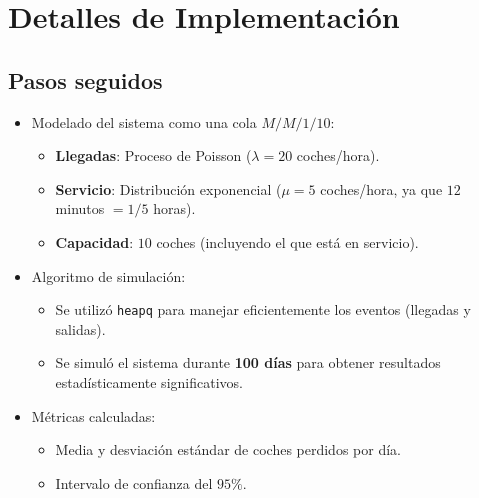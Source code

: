 \documentclass{article}
\begin{document}
\section{Detalles de Implementación}

\subsection{Pasos seguidos}
\begin{itemize}
    \item Modelado del sistema como una cola \( M/M/1/10 \):
    \begin{itemize}
        \item \textbf{Llegadas}: Proceso de Poisson (\(\lambda = 20\) coches/hora).
        \item \textbf{Servicio}: Distribución exponencial (\(\mu = 5\) coches/hora, ya que \(12\) minutos \(= 1/5\) horas).
        \item \textbf{Capacidad}: \(10\) coches (incluyendo el que está en servicio).
    \end{itemize}
    \item Algoritmo de simulación:
    \begin{itemize}
        \item Se utilizó \texttt{heapq} para manejar eficientemente los eventos (llegadas y salidas).
        \item Se simuló el sistema durante \textbf{100 días} para obtener resultados estadísticamente significativos.
    \end{itemize}
    \item Métricas calculadas:
    \begin{itemize}
        \item Media y desviación estándar de coches perdidos por día.
        \item Intervalo de confianza del \(95\%\).
    \end{itemize}
\end{itemize}
\end{document}
